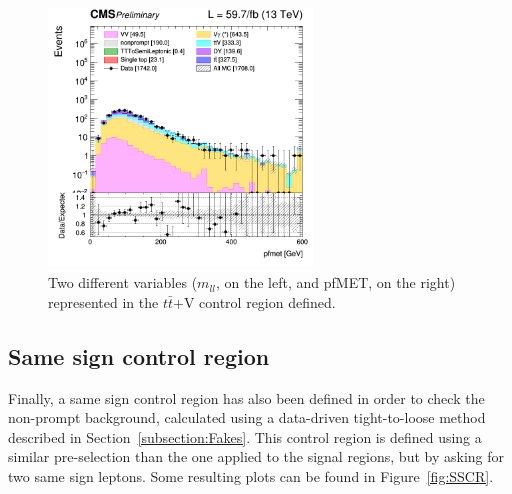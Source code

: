 \documentclass[a4paper, 10pt, openright]{report}
\begin{document}
\begin{figure}[htbp]
{\begin{minipage}[b]{.48\textwidth}
\end{minipage}\hfill
\begin{minipage}[b]{.48\textwidth}
\includegraphics[width=7cm, height=7cm]{figs/2018/log_cratio_ttVCR_ll_METcorrected_pt.png}
\end{minipage} \hfill
}
\caption{Two different variables ($m_{ll}$, on the left, and pf\ac{MET}, on the right) represented in the $t \bar t$+V control region defined.}
\label{fig:ttVCR}
\end{figure}

\subsection{Same sign control region} \label{section:SSCR}

Finally, a same sign control region has also been defined in order to check the non-prompt background, calculated using a data-driven tight-to-loose method described in Section~\ref{subsection:Fakes}. This control region is defined using a similar pre-selection than the one applied to the signal regions, but by asking for two same sign leptons. Some resulting plots can be found in Figure~\ref{fig:SSCR}.
\end{document}

